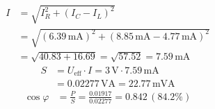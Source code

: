 \begin{align*}
I &= \sqrt{I_R^2 + (I_C - I_L)^2} \\
     &= \sqrt{(6.39 \, \mathrm{mA})^2 + (8.85 \, \mathrm{mA} - 4.77 \, \mathrm{mA})^2} \\
    &= \sqrt{40.83 + 16.69} = \sqrt{57.52} = 7.59 \, \mathrm{mA}
\end{align*}
\begin{align*}
    S &= U_\mathrm{eff} \cdot I = 3 \, \mathrm{V} \cdot 7.59 \, \mathrm{mA} \\
    &= 0.02277 \, \mathrm{VA} = 22.77 \, \mathrm{mVA}
\end{align*}
\begin{align*}
 \cos \varphi &= \frac{P}{S} = \frac{0.01917}{0.02277} = 0.842 \, (84.2\%)
\end{align*}






























































